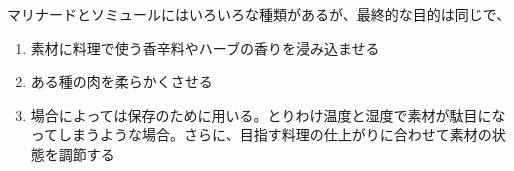 
 

マリナードとソミュールにはいろいろな種類があるが、最終的な目的は同じで、

\begin{enumerate}
\def\labelenumi{\arabic{enumi}.}
\item
  素材に料理で使う香辛料やハーブの香りを浸み込ませる
\item
  ある種の肉を柔らかくさせる
\item
  場合によっては保存のために用いる。とりわけ温度と湿度で素材が駄目になってしまうような場合。さらに、目指す料理の仕上がりに合わせて素材の状態を調節する
\end{enumerate}

